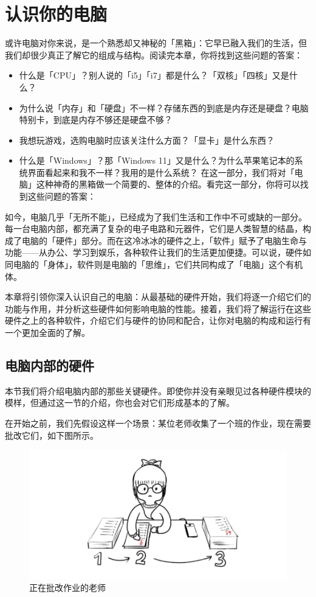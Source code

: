 \chapter{认识你的电脑}
\label{computer-and-its-components}

\begin{intro}
  或许电脑对你来说，是一个熟悉却又神秘的「黑箱」：它早已融入我们的生活，但我们却很少真正了解它的组成与结构。阅读完本章，你将找到这些问题的答案：

  \begin{itemize}
    \item 什么是「CPU」？别人说的「i5」「i7」都是什么？「双核」「四核」又是什么？
    \item 为什么说「内存」和「硬盘」不一样？存储东西的到底是内存还是硬盘？电脑特别卡，到底是内存不够还是硬盘不够？
    \item 我想玩游戏，选购电脑时应该关注什么方面？「显卡」是什么东西？
    \item 什么是「Windows」？那「Windows 11」又是什么？为什么苹果笔记本的系统界面看起来和我不一样？我用的是什么系统？
  在这一部分，我们将对「电脑」这种神奇的黑箱做一个简要的、整体的介绍。看完这一部分，你将可以找到这些问题的答案：
  \end{itemize}
\end{intro}

如今，电脑几乎「无所不能」，已经成为了我们生活和工作中不可或缺的一部分。每一台电脑内部，都充满了复杂的电子电路和元器件，它们是人类智慧的结晶，构成了电脑的「硬件」部分。而在这冷冰冰的硬件之上，「软件」赋予了电脑生命与功能——从办公、学习到娱乐，各种软件让我们的生活更加便捷。可以说，硬件如同电脑的「身体」，软件则是电脑的「思维」，它们共同构成了「电脑」这个有机体。

本章将引领你深入认识自己的电脑：从最基础的硬件开始，我们将逐一介绍它们的功能与作用，并分析这些硬件如何影响电脑的性能。接着，我们将了解运行在这些硬件之上的各种软件，介绍它们与硬件的协同和配合，让你对电脑的构成和运行有一个更加全面的了解。

\section{电脑内部的硬件} 

本节我们将介绍电脑内部的那些关键硬件。即使你并没有亲眼见过各种硬件模块的模样，但通过这一节的介绍，你也会对它们形成基本的了解。

在开始之前，我们先假设这样一个场景：某位老师收集了一个班的作业，现在需要批改它们，如下图所示。

\begin{figure}[htb!]
  \centering
  \includegraphics[width=.5\textwidth]{assets/basic/Teacher_and_homework.png}
  \caption{正在批改作业的老师}
  \label{fig:teacher-and-homework}
\end{figure}

